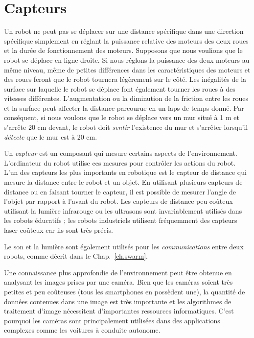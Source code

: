 
\chapter{Capteurs}\label{ch.sensors}

Un robot ne peut pas se déplacer sur une distance spécifique dans une direction spécifique simplement en réglant la puissance relative des moteurs des deux roues et la durée de fonctionnement des moteurs. Supposons que nous voulions que le robot se déplace en ligne droite. Si nous réglons la puissance des deux moteurs au même niveau, même de petites différences dans les caractéristiques des moteurs et des roues feront que le robot tournera légèrement sur le côté. Les inégalités de la surface sur laquelle le robot se déplace font également tourner les roues à des vitesses différentes. L'augmentation ou la diminution de la friction entre les roues et la surface peut affecter la distance parcourue en un laps de temps donné. Par conséquent, si nous voulons que le robot se déplace vers un mur situé à 1 m et s'arrête 20 cm devant, le robot doit \emph{sentir} l'existence du mur et s'arrêter lorsqu'il \emph{détecte} que le mur est à 20 cm.

Un \emph{capteur} est un composant qui mesure certains aspects de l'environnement. L'ordinateur du robot utilise ces mesures pour contrôler les actions du robot. L'un des capteurs les plus importants en robotique est le capteur de distance qui mesure la distance entre le robot et un objet. En utilisant plusieurs capteurs de distance ou en faisant tourner le capteur, il est possible de mesurer l'angle de l'objet par rapport à l'avant du robot. Les capteurs de distance peu coûteux utilisant la lumière infrarouge ou les ultrasons sont invariablement utilisés dans les robots éducatifs ; les robots industriels utilisent fréquemment des capteurs laser coûteux car ils sont très précis.

Le son et la lumière sont également utilisés pour les \emph{communications} entre deux robots, comme décrit dans le Chap.~\ref{ch.swarm}.

Une connaissance plus approfondie de l'environnement peut être obtenue en analysant les images prises par une caméra. Bien que les caméras soient très petites et peu coûteuses (tous les smartphones en possèdent une), la quantité de données contenues dans une image est très importante et les algorithmes de traitement d'image nécessitent d'importantes ressources informatiques. C'est pourquoi les caméras sont principalement utilisées dans des applications complexes comme les voitures à conduite autonome.


